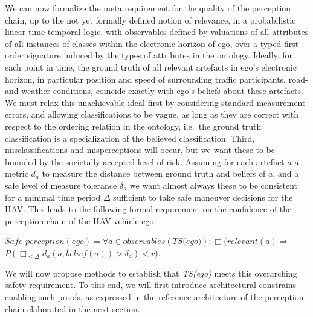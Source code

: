 We can now formalize the meta requirement for the quality of the perception chain, up to the not yet formally defined notion of relevance, in a probabilistic linear time temporal logic, with observables defined by valuations of all attributes of all instances of classes within the electronic horizon of ego, over a typed first-order signature induced by the types of attributes in the ontology. Ideally, for each point in time, the ground truth of all relevant artefacts in ego's electronic horizon, in particular position and speed of surrounding traffic participants, road- and weather conditions, coincide exactly with ego's beliefs about these artefacts. We must relax this unachievable ideal first by considering standard measurement errors, and allowing classifications to be vague, as long as they are correct with respect to the ordering relation in the ontology, i.e.\ the ground truth classification is a specialization of the believed classification. Third, misclassifications and misperceptions will occur, but we want these to be bounded by the societally accepted level of risk. Assuming for each artefact $a$ a metric $d_a$ to measure the distance between ground truth and beliefs of $a$, and a safe level of measure tolerance $\delta_a$ we want almost always these to be consistent for a minimal time period $\Delta$ sufficient to take safe maneuver decisions for the HAV. This leads to the following formal requirement on the confidence of the perception chain of the HAV vehicle ego:

$\textit{Safe\_perception}(ego) = \forall a \in \textit{observables}(\textit{TS(ego)}):  \Box (\textit{relevant}(a) \Rightarrow$\hfil\\ $P(\Box_{\leq\Delta}d_a(a, \textit{belief}(a))> \delta_a) < r)$.

We will now propose methods to establish that \textit{TS(ego)} meets this overarching safety requirement. To this end, we will first introduce architectural constrains enabling such proofs, as expressed in the reference architecture of the perception chain elaborated in the next section.



